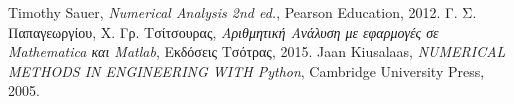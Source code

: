 \begin{thebibliography}{3} 
     Timothy Sauer, \emph{Numerical Analysis 2nd ed.}, Pearson Education, 2012.
     Γ. Σ. Παπαγεωργίου, Χ. Γρ. Τσίτσουρας, \emph{Αριθμητική Ανάλυση με εφαρμογές σε Mathematica και Matlab}, Εκδόσεις Τσότρας, 2015.
     Jaan Kiusalaas, \emph{NUMERICAL METHODS IN ENGINEERING WITH Python},
    Cambridge University Press, 2005.
\end{thebibliography}